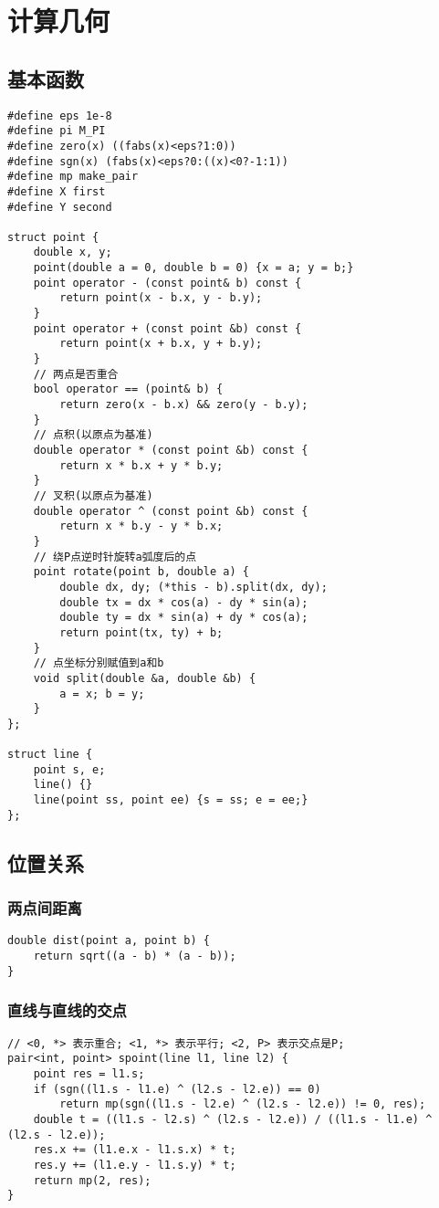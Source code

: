 \documentclass[a4]{article}
\begin{document}
\section{计算几何}
\subsection{基本函数}
\begin{lstlisting}
#define eps 1e-8
#define pi M_PI
#define zero(x) ((fabs(x)<eps?1:0))
#define sgn(x) (fabs(x)<eps?0:((x)<0?-1:1))
#define mp make_pair
#define X first
#define Y second

struct point {
    double x, y;
    point(double a = 0, double b = 0) {x = a; y = b;}
    point operator - (const point& b) const {
        return point(x - b.x, y - b.y);
    }
    point operator + (const point &b) const {
        return point(x + b.x, y + b.y);
    }
    // 两点是否重合
    bool operator == (point& b) {
        return zero(x - b.x) && zero(y - b.y);
    }
    // 点积(以原点为基准)
    double operator * (const point &b) const {
        return x * b.x + y * b.y;
    }
    // 叉积(以原点为基准)
    double operator ^ (const point &b) const {
        return x * b.y - y * b.x;
    }
    // 绕P点逆时针旋转a弧度后的点
    point rotate(point b, double a) {
        double dx, dy; (*this - b).split(dx, dy);
        double tx = dx * cos(a) - dy * sin(a);
        double ty = dx * sin(a) + dy * cos(a);
        return point(tx, ty) + b;
    }
    // 点坐标分别赋值到a和b
    void split(double &a, double &b) {
        a = x; b = y;
    }
};

struct line {
    point s, e;
    line() {}
    line(point ss, point ee) {s = ss; e = ee;}
};
\end{lstlisting}
\subsection{位置关系}
\subsubsection{两点间距离}
\begin{lstlisting}
double dist(point a, point b) {
    return sqrt((a - b) * (a - b));
}
\end{lstlisting}
\subsubsection{直线与直线的交点}
\begin{lstlisting}
// <0, *> 表示重合; <1, *> 表示平行; <2, P> 表示交点是P;
pair<int, point> spoint(line l1, line l2) {
    point res = l1.s;
    if (sgn((l1.s - l1.e) ^ (l2.s - l2.e)) == 0)
        return mp(sgn((l1.s - l2.e) ^ (l2.s - l2.e)) != 0, res);
    double t = ((l1.s - l2.s) ^ (l2.s - l2.e)) / ((l1.s - l1.e) ^ (l2.s - l2.e));
    res.x += (l1.e.x - l1.s.x) * t;
    res.y += (l1.e.y - l1.s.y) * t;
    return mp(2, res);
}\end{lstlisting}
\end{document}

